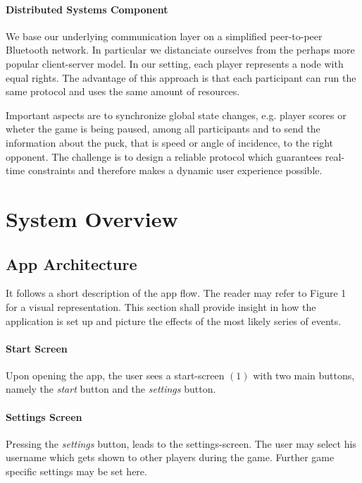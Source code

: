 \documentclass{report}
\begin{document}
\paragraph{Distributed Systems Component} We base our underlying communication layer on a simplified peer-to-peer Bluetooth network. In particular we distanciate ourselves from the perhaps more popular client-server model. In our setting, each player represents a node with equal rights. The advantage of this approach is that each participant can run the same protocol and uses the same amount of resources. 

Important aspects are to synchronize global state changes, e.g. player scores or wheter the game is being paused, among all participants and to send the information about the puck, that is speed or angle of incidence, to the right opponent. The challenge is to design a reliable protocol which guarantees real-time constraints and therefore makes a dynamic user experience possible.

\section{System Overview}

\subsection{App Architecture} 
It follows a short description of the app flow. The reader may refer to Figure 1 for a visual representation. This section shall provide insight in how the application is set up and picture the effects of the most likely series of events.

\paragraph{Start Screen}
 Upon opening the app, the user sees a start-screen $(1)$ with two main buttons, namely the \textit{start} button and the \textit{settings} button. 

\paragraph{Settings Screen}
Pressing the \textit{settings} button, leads to the settings-screen. The user may select his username which gets shown to other players during the game. Further game specific settings may be set here.
\end{document}

